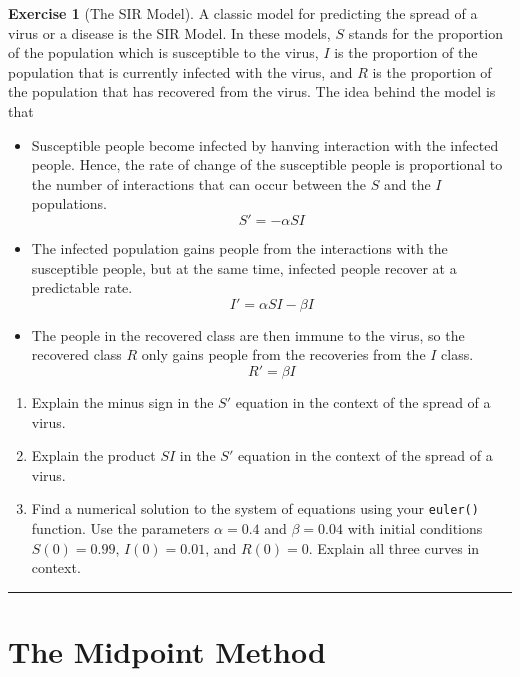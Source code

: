 \documentclass[
]{book}
\providecommand{\tightlist}{%
  \setlength{\itemsep}{0pt}\setlength{\parskip}{0pt}}
\theoremstyle{definition}
\theoremstyle{definition}
\theoremstyle{definition}
\newtheorem{exercise}{Exercise}[chapter]
\theoremstyle{remark}
\begin{document}
\begin{exercise}[The SIR Model]
\protect\hypertarget{exr:unnamed-chunk-438}{}{\label{exr:unnamed-chunk-438} {} }A classic model for predicting the spread of a virus or a disease is the SIR Model. In these models, \(S\) stands for the proportion of the population which is susceptible to the virus, \(I\) is the proportion of the population that is currently infected with the virus, and \(R\) is the proportion of the population that has recovered from the virus. The idea behind the model is that

\begin{itemize}
\tightlist
\item
  Susceptible people become infected by hanving interaction with the infected people. Hence, the rate of change of the susceptible people is proportional to the number of interactions that can occur between the \(S\) and the \(I\) populations.\\
  \[ S' = -\alpha SI \]
\item
  The infected population gains people from the interactions with the susceptible people, but at the same time, infected people recover at a predictable rate.
  \[ I' = \alpha SI - \beta I \]
\item
  The people in the recovered class are then immune to the virus, so the recovered class \(R\) only gains people from the recoveries from the \(I\) class.
  \[ R' = \beta I \]
\end{itemize}

\begin{enumerate}
\def\labelenumi{\alph{enumi}.}
\tightlist
\item
  Explain the minus sign in the \(S'\) equation in the context of the spread of a virus.
\item
  Explain the product \(SI\) in the \(S'\) equation in the context of the spread of a virus.
\item
  Find a numerical solution to the system of equations using your \texttt{euler()} function. Use the parameters \(\alpha = 0.4\) and \(\beta = 0.04\) with initial conditions \(S(0) = 0.99\), \(I(0) = 0.01\), and \(R(0) = 0\). Explain all three curves in context.
\end{enumerate}
\end{exercise}

\begin{center}\rule{0.5\linewidth}{0.5pt}\end{center}

\hypertarget{the-midpoint-method}{%
\section{The Midpoint Method}\label{the-midpoint-method}}
\end{document}
